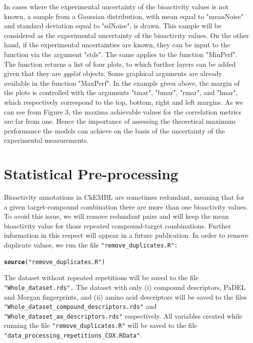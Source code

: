 \documentclass[twoside,a4wide,12pt]{article}\usepackage[]{graphicx}\usepackage[]{color}
\makeatletter
\newcommand{\hlstr}[1]{\textcolor[rgb]{0.192,0.494,0.8}{#1}}%
\newcommand{\hlstd}[1]{\textcolor[rgb]{0.345,0.345,0.345}{#1}}%
\newcommand{\hlkwd}[1]{\textcolor[rgb]{0.737,0.353,0.396}{\textbf{#1}}}%
\newenvironment{kframe}{%
 \def\at@end@of@kframe{}%
 \ifinner\ifhmode%
  \def\at@end@of@kframe{\end{minipage}}%
  \begin{minipage}{\columnwidth}%
 \fi\fi%
 \def\FrameCommand##1{\hskip\@totalleftmargin \hskip-\fboxsep
 \colorbox{shadecolor}{##1}\hskip-\fboxsep
     \hskip-\linewidth \hskip-\@totalleftmargin \hskip\columnwidth}%
 \MakeFramed {\advance\hsize-\width
   \@totalleftmargin\z@ \linewidth\hsize
   \@setminipage}}%
 {\par\unskip\endMakeFramed%
 \at@end@of@kframe}
\newenvironment{knitrout}{}{} %
\makeatother
\begin{document}
In cases where the experimental uncertainty of the bioactivity values is not known, 
a sample from a Gaussian distribution,
with mean equal to "meanNoise" and standard deviation equal to "sdNoise",
is drawn. 
This sample will be considered as the experimental uncertainty of the bioactivity values.
On the other hand, if the experimental uncertainties are known, they can be input to the function via the argument 
"stds". 
The same applies to the function "MinPerf".
The function returns a list of four plots, to which further layers can be added given that they are {\it ggplot} objects.
Some graphical arguments are already available in the function "MaxPerf".
In the example given above, the margin of the plots is controlled with the arguments "tmar", "bmar", "rmar", and "lmar",
which respectively correspond to the top, bottom, right and left margins.
As we can see from Figure 3, the maxima achievable values for the correlation metrics are far from one.
Hence the importance of assessing the theoretical maximum performance the models can achieve on the basis of the uncertainty of the experimental measurements.

\section{Statistical Pre-processing}
Bioactivity annotations in ChEMBL are sometimes redundant, 
meaning that for a given target-compound combination there are more than one bioactivity values.
To avoid this issue, we will remove redundant pairs and will keep the mean bioactivity value for those repeated compound-target combinations.
Further information in this respect will appear in a future publication.
In order to remove duplicate values, we run the file \verb|"remove_duplicates.R":|
\begin{knitrout}
\color{fgcolor}\begin{kframe}
\begin{alltt}
\hlkwd{source}\hlstd{(}\hlstr{"remove_duplicates.R"}\hlstd{)}
\end{alltt}
\end{kframe}
\end{knitrout}

The dataset without repeated repetitions will be saved to the file \verb|"Whole_dataset.rds".|
The dataset with only (i) compound descriptors, PaDEL and Morgan fingerprints, and (ii) amino acid descriptors
will be saved to the files \verb|"Whole_dataset_compound_descriptors.rds"| and \verb|"Whole_dataset_aa_descriptors.rds"|
respectively. All variables created while running the file \verb|"remove_duplicates.R"| will be saved to the file\\
\verb|"data_processing_repetitions_COX.RData"|.
\end{document}

